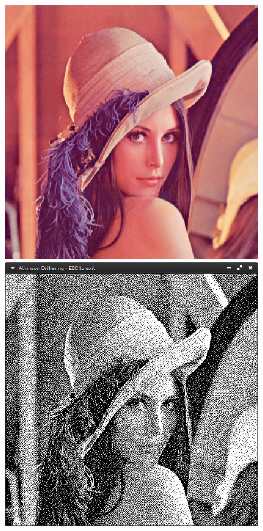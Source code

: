 \documentclass[12pt,openany,a4,usenames,dvipsnames]{book}
\begin{document}
\begin{figure}[H]
  \centering
  \begin{minipage}{0.48\textwidth}
  \includegraphics[width=\textwidth,keepaspectratio]{figures/lenna.jpg}
  \end{minipage}
  \hspace{.4em}
  \begin{minipage}{0.48\textwidth}
  \includegraphics[width=\textwidth,keepaspectratio]{figures/atkinson_dithering_lena.png}
  \end{minipage}
\end{figure}
\end{document}
